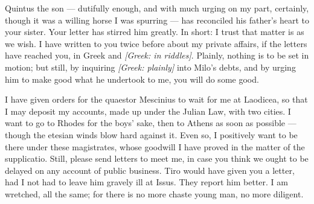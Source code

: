 

 Quintus the son --- dutifully enough, and with much urging on my part, certainly, though it was a willing horse I was spurring --- has reconciled his father's heart to your sister. Your letter has stirred him greatly. In short: I trust that matter is as we wish. I have written to you twice before about my private affairs, if the letters have reached you, in Greek and \textit{[Greek: in riddles]}. Plainly, nothing is to be set in motion; but still, by inquiring \textit{[Greek: plainly]} into Milo's debts, and by urging him to make good what he undertook to me, you will do some good.

 I have given orders for the quaestor Mescinius to wait for me at Laodicea, so that I may deposit my accounts, made up under the Julian Law, with two cities. I want to go to Rhodes for the boys' sake, then to Athens as soon as possible --- though the etesian winds blow hard against it. Even so, I positively want to be there under these magistrates, whose goodwill I have proved in the matter of the supplicatio. Still, please send letters to meet me, in case you think we ought to be delayed on any account of public business. Tiro would have given you a letter, had I not had to leave him gravely ill at Issus. They report him better. I am wretched, all the same; for there is no more chaste young man, no more diligent.
